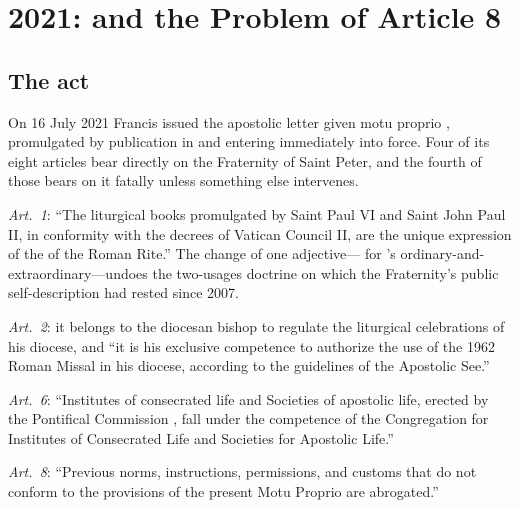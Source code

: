 \section{2021:  and the Problem of Article 8}

\subsection{The act}

On 16 July 2021 Francis issued the apostolic letter given motu proprio
, promulgated by publication in
 and entering immediately into force. Four of
its eight articles bear directly on the Fraternity of Saint Peter, and
the fourth of those bears on it fatally unless something else
intervenes.

\emph{Art.~1}: ``The liturgical books promulgated by Saint Paul VI and
Saint John Paul II, in conformity with the decrees of Vatican Council II,
are the unique expression of the  of the Roman Rite.''
The change of one adjective--- for 's ordinary-and-extraordinary---undoes the two-usages doctrine
on which the Fraternity's public self-description had rested since 2007.

\emph{Art.~2}: it belongs to the diocesan bishop to regulate the
liturgical celebrations of his diocese, and ``it is his exclusive
competence to authorize the use of the 1962 Roman Missal in his diocese,
according to the guidelines of the Apostolic See.''

\emph{Art.~6}: ``Institutes of consecrated life and Societies of
apostolic life, erected by the Pontifical Commission ,
fall under the competence of the Congregation for Institutes of
Consecrated Life and Societies for Apostolic Life.''

\emph{Art.~8}: ``Previous norms, instructions, permissions, and customs
that do not conform to the provisions of the present Motu Proprio are
abrogated.''

